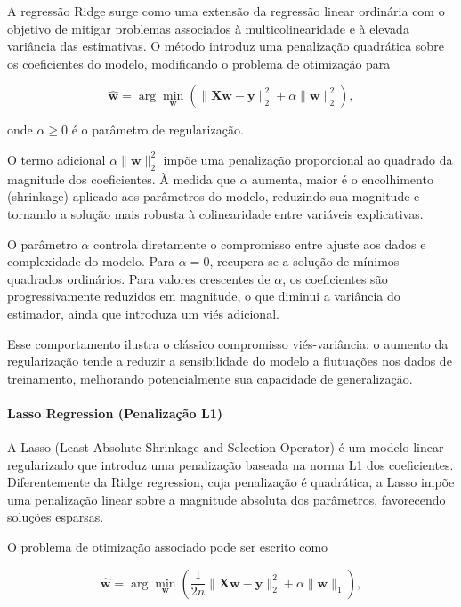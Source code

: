 A regressão Ridge surge como uma extensão da regressão linear ordinária com o objetivo de mitigar problemas associados à multicolinearidade e à elevada variância das estimativas. O método introduz uma penalização quadrática sobre os coeficientes do modelo, modificando o problema de otimização para

\begin{equation}
\hat{\mathbf{w}}
=
\arg\min_{\mathbf{w}}
\left(
\|\mathbf{X}\mathbf{w} - \mathbf{y}\|_2^2
+
\alpha \|\mathbf{w}\|_2^2
\right),
\end{equation}

onde \(\alpha \ge 0\) é o parâmetro de regularização.


\medskip

O termo adicional \(\alpha \|\mathbf{w}\|_2^2\) impõe uma penalização proporcional ao quadrado da magnitude dos coeficientes. À medida que \(\alpha\) aumenta, maior é o encolhimento (shrinkage) aplicado aos parâmetros do modelo, reduzindo sua magnitude e tornando a solução mais robusta à colinearidade entre variáveis explicativas.

O parâmetro \(\alpha\) controla diretamente o compromisso entre ajuste aos dados e complexidade do modelo. Para \(\alpha = 0\), recupera-se a solução de mínimos quadrados ordinários. Para valores crescentes de \(\alpha\), os coeficientes são progressivamente reduzidos em magnitude, o que diminui a variância do estimador, ainda que introduza um viés adicional.

Esse comportamento ilustra o clássico compromisso viés-variância: o aumento da regularização tende a reduzir a sensibilidade do modelo a flutuações nos dados de treinamento, melhorando potencialmente sua capacidade de generalização.

\paragraph{Lasso Regression (Penalização L1)}

A Lasso (Least Absolute Shrinkage and Selection Operator) é um modelo linear regularizado que introduz uma penalização baseada na norma L1 dos coeficientes. Diferentemente da Ridge regression, cuja penalização é quadrática, a Lasso impõe uma penalização linear sobre a magnitude absoluta dos parâmetros, favorecendo soluções esparsas.

O problema de otimização associado pode ser escrito como

\begin{equation}
\hat{\mathbf{w}}
=
\arg\min_{\mathbf{w}}
\left(
\frac{1}{2n}
\|\mathbf{X}\mathbf{w} - \mathbf{y}\|_2^2
+
\alpha \|\mathbf{w}\|_1
\right),
\end{equation}

